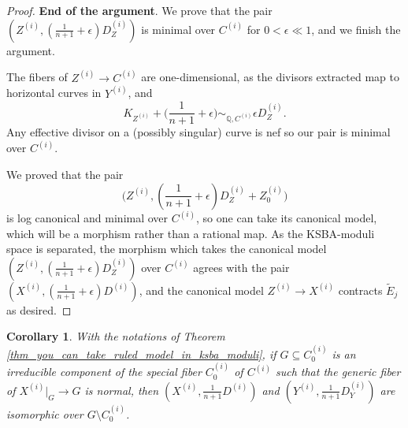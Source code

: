 \documentclass[a4paper,12pt]{amsart}
\newcommand{\bQ}{{\mathbb Q}}
\newtheorem{corollary}[theorem]{Corollary}
\theoremstyle{definition}
\theoremstyle{remark}
\begin{document}
\begin{proof}
\textbf{End of the argument}. We prove that the pair $\left(Z^{(i)},(\frac{1}{n+1} +\epsilon)D_Z^{(i)}\right)$ is minimal over $C^{(i)}$ for $0<\epsilon \ll 1$, and we finish the argument.

The fibers of $Z^{(i)}\to C^{(i)}$ are one-dimensional, as the divisors extracted map to horizontal curves in $Y^{(i)}$, and 
\[\textstyle
K_{Z^{(i)}}+\big(\frac{1}{n+1} +\epsilon\big)\sim_{\bQ,C^{(i)}} \epsilon D_Z^{(i)}.
\]
Any effective divisor on a (possibly singular) curve is nef so our pair is minimal over $C^{(i)}$.

We proved that the pair
     \[\textstyle \big(Z^{(i)},(\frac{1}{n+1} +\epsilon)D_Z^{(i)} + Z^{(i)}_0\big)\]
     is log canonical and minimal over $C^{(i)}$, so one can take its canonical model, which will be a morphism rather than a rational map. As the KSBA-moduli space is separated, the morphism which takes the canonical model $(Z^{(i)},(\frac{1}{n+1} +\epsilon)D_Z^{(i)})$ over $C^{(i)}$ agrees with the pair $(X^{(i)},(\frac{1}{n+1} +\epsilon)D^{(i)})$,  and
         the canonical model $Z^{(i)}\to X^{(i)}$ contracts $\widetilde{E}_j$ as desired.
\end{proof}

 \begin{corollary}
     With the notations of Theorem \ref{thm_you_can_take_ruled_model_in_ksba_moduli}, if $G\subseteq C_0^{(i)}$ is an irreducible component of the special fiber $C_0^{(i)}$ of $C^{(i)}$ such that the generic fiber of $X^{(i)}|_G\to G$ is normal, then $(X^{(i)},\frac{1}{n+1}D^{(i)})$ and $(Y^{(i)},\frac{1}{n+1}D_Y^{(i)})$ are isomorphic over $G\setminus C_0^{(i)}$.
 \end{corollary}
 
\end{document}
